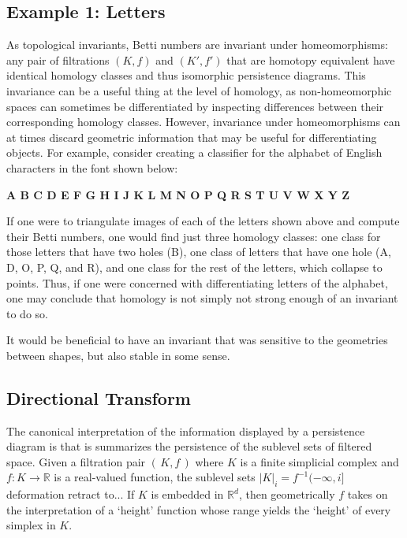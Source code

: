 \documentclass[10pt]{article}
\numberwithin{equation}{section}
\newcommand{\+}{%
	\raisebox{0.18ex}{\scaleobj{0.55}{+}}
}
\theoremstyle{definition}
\begin{document}
\subsection{Example 1: Letters}
As topological invariants, Betti numbers are invariant under homeomorphisms: any pair of filtrations $(K, f)$ and $(K', f')$ that are homotopy equivalent have identical homology classes and thus isomorphic persistence diagrams. 
This invariance can be a useful thing at the level of homology, as non-homeomorphic spaces can sometimes be differentiated by inspecting differences between their corresponding homology classes. 
However, invariance under homeomorphisms can at times discard geometric information that may be useful for differentiating objects.
For example, consider creating a classifier for the alphabet of English characters in the font shown below:
\vspace{0.5em}
\\
\vspace{0.5em}
\begin{ttfamily}
	\selectfont \bfseries
	\hfill A B C D E F G H I J K L M N O P Q R S T U V W X Y Z \hfill 
\end{ttfamily}

\noindent If one were to triangulate images of each of the letters shown above and compute their Betti numbers, one would find just three homology classes: one class for those letters that have two holes (B), one class of letters that have one hole (A, D, O, P, Q, and R), and one class for the rest of the letters, which collapse to points. Thus, if one were concerned with differentiating letters of the alphabet, one may conclude that homology is not simply not strong enough of an invariant to do so. 

It would be beneficial to have an invariant that was sensitive to the geometries between shapes, but also stable in some sense.

\newpage

\subsection*{Directional Transform}
The canonical interpretation of the information displayed by a persistence diagram is that is summarizes the persistence of the sublevel sets of filtered space. Given a filtration pair $(\, K, f \, )$ where $K$ is a finite simplicial complex and $f : K \to \mathbb{R}$ is a real-valued function, the sublevel sets $\lvert K \rvert_i=f^{-1}(-\infty, i]$ deformation retract to... %
If $K$ is embedded in $\mathbb{R}^d$, then geometrically $f$ takes on the interpretation of a `height' function whose range yields the `height' of every simplex in $K$. 
\end{document}
